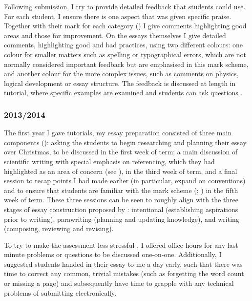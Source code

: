 Following submission, I try to provide detailed feedback that students could use. For each student, I ensure there is one aspect that was given specific praise\citep{Henderlong2002}. Together with their mark for each category () I give comments highlighting good areas and those for improvement. On the essays themselves I give detailed comments, highlighting good and bad practices, using two different colours: one colour for smaller matters such as spelling or typographical errors, which are not normally considered important feedback \citep[chapter 4]{Irons2008} but are emphasised in this mark scheme, and another colour for the more complex issues, such as comments on physics, logical development or essay structure. The feedback is discussed at length in tutorial, where specific examples are examined and students can ask questions \citep[chapter 2]{Irons2008}.

\subsubsection{2013/2014}\label{sec:teach2013-14}

The first year I gave tutorials, my essay preparation consisted of three main components (): asking the students to begin researching and planning their essay over Christmas, to be discussed in the first week of term; a main discussion of scientific writing with special emphasis on referencing, which they had highlighted as an area of concern (see ), in the third week of term, and a final session to recap points I had made earlier (in particular, expand on conventions) and to ensure that students are familiar with the mark scheme (\citealt[chapter 8]{Ramsden1992}; \citealt{Bell2012}) in the fifth week of term. These three sessions can be seen to roughly align with the three stages of essay construction proposed by \citet{Biggs1988}: intentional (establishing aspirations prior to writing), parawriting (planning and updating knowledge), and writing (composing, reviewing and revising).

To try to make the assessment less stressful \citep[chapter 10]{Ramsden1992}, I offered office hours for any last minute problems or questions to be discussed one-on-one. Additionally, I suggested students handed in their essay to me a day early, such that there was time to correct any common, trivial mistakes (such as forgetting the word count or missing a page) and subsequently have time to grapple with any technical problems of submitting electronically.


